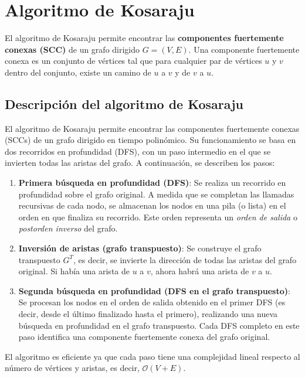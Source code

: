 \documentclass[a4paper,12pt]{article}
\begin{document}
\section{Algoritmo de Kosaraju}

El algoritmo de Kosaraju permite encontrar las \textbf{componentes fuertemente conexas (SCC)} de un grafo dirigido $G = (V, E)$. Una componente fuertemente conexa es un conjunto de vértices tal que para cualquier par de vértices $u$ y $v$ dentro del conjunto, existe un camino de $u$ a $v$ y de $v$ a $u$.

\subsection*{Descripción del algoritmo de Kosaraju}

El algoritmo de Kosaraju permite encontrar las componentes fuertemente conexas (SCCs) de un grafo dirigido en tiempo polinómico. Su funcionamiento se basa en dos recorridos en profundidad (DFS), con un paso intermedio en el que se invierten todas las aristas del grafo. A continuación, se describen los pasos:

\begin{enumerate}
    \item \textbf{Primera búsqueda en profundidad (DFS)}: Se realiza un recorrido en profundidad sobre el grafo original. A medida que se completan las llamadas recursivas de cada nodo, se almacenan los nodos en una pila (o lista) en el orden en que finaliza su recorrido. Este orden representa un \textit{orden de salida} o \textit{postorden inverso} del grafo.
    
    \item \textbf{Inversión de aristas (grafo transpuesto)}: Se construye el grafo transpuesto $G^T$, es decir, se invierte la dirección de todas las aristas del grafo original. Si había una arista de $u$ a $v$, ahora habrá una arista de $v$ a $u$.
    
    \item \textbf{Segunda búsqueda en profundidad (DFS en el grafo transpuesto)}: Se procesan los nodos en el orden de salida obtenido en el primer DFS (es decir, desde el último finalizado hasta el primero), realizando una nueva búsqueda en profundidad en el grafo transpuesto. Cada DFS completo en este paso identifica una componente fuertemente conexa del grafo original.
\end{enumerate}

El algoritmo es eficiente ya que cada paso tiene una complejidad lineal respecto al número de vértices y aristas, es decir, $\mathcal{O}(V + E)$.
\end{document}
